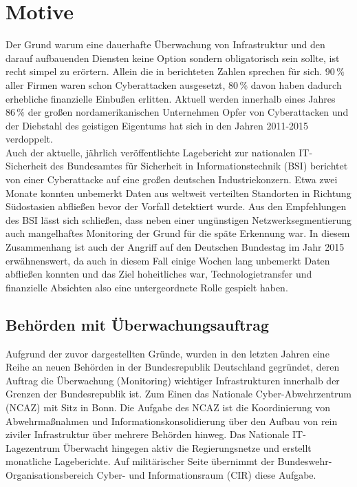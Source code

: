 \section{Motive}

Der Grund warum eine dauerhafte Überwachung von Infrastruktur und den darauf aufbauenden 
Diensten keine Option sondern obligatorisch sein sollte, ist recht simpel zu erörtern. 
Allein die in \cite[461]{francia} berichteten Zahlen sprechen für sich. $90\,\%$ aller 
Firmen waren schon Cyberattacken ausgesetzt, $80\,\%$ davon haben dadurch erhebliche 
finanzielle Einbußen erlitten. Aktuell werden innerhalb eines Jahres $86\,\%$ der großen 
nordamerikanischen Unternehmen Opfer von Cyberattacken und der Diebstahl des geistigen 
Eigentums hat sich in den Jahren 2011-2015 verdoppelt.\\
Auch der aktuelle, jährlich veröffentlichte Lagebericht zur nationalen IT-Sicherheit des
Bundesamtes für Sicherheit in Informationstechnik (BSI) \cite[12]{bsi-lage} berichtet  
von einer Cyberattacke auf eine großen deutschen Industriekonzern. Etwa zwei Monate 
konnten unbemerkt Daten aus weltweit verteilten Standorten in Richtung Südostasien 
abfließen bevor der Vorfall detektiert wurde. Aus den Empfehlungen des BSI lässt sich 
schließen, dass neben einer ungünstigen Netzwerksegmentierung auch mangelhaftes Monitoring
der Grund für die späte Erkennung war. In diesem Zusammenhang ist auch der Angriff auf 
den Deutschen Bundestag im Jahr 2015 erwähnenswert, da auch in diesem Fall einige Wochen 
lang unbemerkt Daten abfließen konnten und das Ziel hoheitliches war, 
Technologietransfer und finanzielle Absichten also eine untergeordnete Rolle gespielt 
haben.
\subsection{Behörden mit Überwachungsauftrag}

Aufgrund der zuvor dargestellten Gründe, wurden in den letzten Jahren eine Reihe an neuen 
Behörden in der Bundesrepublik Deutschland gegründet, deren Auftrag die Überwachung 
(Monitoring) wichtiger Infrastrukturen innerhalb der Grenzen der Bundesrepublik ist. Zum 
Einen das Nationale Cyber-Abwehrzentrum (NCAZ) \cite{web_ncaz} mit Sitz in Bonn. Die 
Aufgabe 
des NCAZ ist 
die Koordinierung von Abwehrmaßnahmen und Informationskonsolidierung über den Aufbau von 
rein ziviler Infrastruktur über mehrere Behörden hinweg. Das Nationale IT-Lagezentrum 
\cite{web_lagezentrum} 
Überwacht hingegen aktiv die Regierungsnetze und erstellt monatliche Lageberichte. Auf 
militärischer Seite übernimmt der Bundeswehr-Organisationsbereich Cyber- und 
Informationsraum (CIR) diese Aufgabe.

